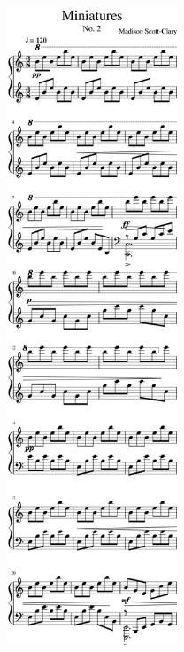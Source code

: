 \begin{rightcolumn*}
\noindent\includegraphics[width=2in]{assets/static/miniatures/2-1.png}


\end{rightcolumn*}
